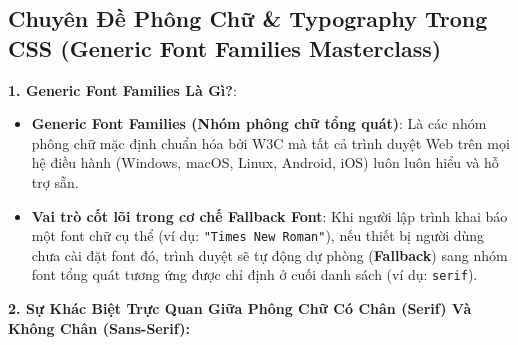 \documentclass[11pt,oneside]{book}
\newcommand{\codeinline}[1]{\textcolor{accentOrange}{\texttt{#1}}}
\newcommand{\term}[1]{\textbf{\textcolor{primaryBlue}{#1}}}
\begin{document}
\subsection{Chuyên Đề Phông Chữ \& Typography Trong CSS (Generic Font Families Masterclass)}
\label{sec:css_typography_foundations}

\begin{conceptBox}
\textbf{1. Generic Font Families Là Gì?}:
\begin{itemize}[leftmargin=1.5em, itemsep=3pt, parsep=0pt]
    \item \textbf{\term{Generic Font Families} (Nhóm phông chữ tổng quát)}: Là các nhóm phông chữ mặc định chuẩn hóa bởi W3C mà tất cả trình duyệt Web trên mọi hệ điều hành (Windows, macOS, Linux, Android, iOS) luôn luôn hiểu và hỗ trợ sẵn.
    \item \textbf{Vai trò cốt lõi trong cơ chế Fallback Font}: Khi người lập trình khai báo một font chữ cụ thể (ví dụ: \codeinline{"Times New Roman"}), nếu thiết bị người dùng chưa cài đặt font đó, trình duyệt sẽ tự động dự phòng (\term{Fallback}) sang nhóm font tổng quát tương ứng được chỉ định ở cuối danh sách (ví dụ: \codeinline{serif}).
\end{itemize}
\end{conceptBox}

\textbf{2. Sự Khác Biệt Trực Quan Giữa Phông Chữ Có Chân (Serif) Và Không Chân (Sans-Serif):}
\end{document}
